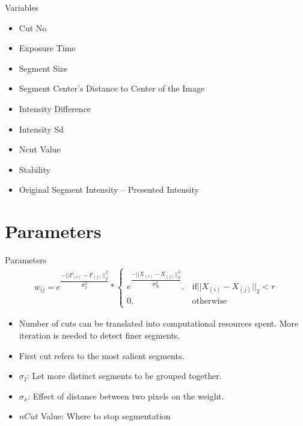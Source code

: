 \documentclass[10pt,xcolor=svgnames]{beamer} %
\begin{document}
\begin{frame}{Variables}
    \begin{itemize}
        \item Cut No
        \item Exposure Time
        \item Segment Size
        \item Segment Center’s Distance to Center of the Image
        \item Intensity Difference
        \item Intensity Sd
        \item Ncut Value
        \item Stability
        \item Original Segment Intensity – Presented Intensity
    \end{itemize}
\end{frame}

\section{Parameters}
\begin{frame}{Parameters}
    \begin{align}
        w_{ij} = e^{\dfrac{-||F_{(i)} - F_{(j)}||_2^2}{\sigma_I^2}}
        *
            \begin{cases}
            e^\dfrac{-||X_{(i)} - X_{(j)}||_2^2}{\sigma_X^2}, &  \text{if} ||X_{(i)} - X_{(j)}||_2 < r\\
            0,                                               &  \text{otherwise}
            \end{cases}
    \end{align}
    \begin{itemize}
        \item Number of cuts can be translated into computational resources spent. More iteration is needed to detect finer segments.
        \item First cut refers to the most salient segments.
        \item $\sigma_I$: Let more distinct segments to be grouped together.
        \item $\sigma_x$: Effect of distance between two pixels on the weight.
        \item $nCut$ Value: Where to stop segmentation
    \end{itemize}
\end{frame}
\end{document}
